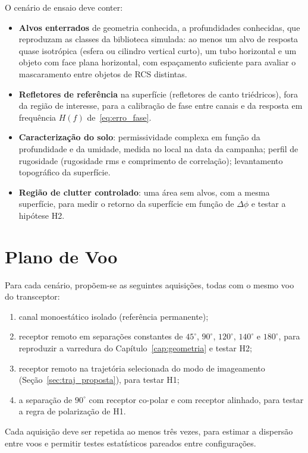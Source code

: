 \documentclass[12pt,a4paper,oneside]{book}
\theoremstyle{remark}
\theoremstyle{plain}
\theoremstyle{definition}
\begin{document}
O cenário de ensaio deve conter:
\begin{itemize}
  \item \textbf{Alvos enterrados} de geometria conhecida, a profundidades
  conhecidas, que reproduzam as classes da biblioteca simulada: ao menos um alvo
  de resposta quase isotrópica (esfera ou cilindro vertical curto), um tubo
  horizontal e um objeto com face plana horizontal, com espaçamento suficiente
  para avaliar o mascaramento entre objetos de RCS distintas.
  \item \textbf{Refletores de referência} na superfície (refletores de canto
  triédricos), fora da região de interesse, para a calibração de fase entre
  canais e da resposta em frequência $H(f)$ de~\eqref{eq:erro_fase}.
  \item \textbf{Caracterização do solo}: permissividade complexa em função da
  profundidade e da umidade, medida no local na data da campanha; perfil de
  rugosidade (rugosidade rms e comprimento de correlação); levantamento
  topográfico da superfície.
  \item \textbf{Região de clutter controlado}: uma área sem alvos, com a mesma
  superfície, para medir o retorno da superfície em função de $\Delta\phi$ e
  testar a hipótese H2.
\end{itemize}

\section{Plano de Voo}
\label{sec:real_voo}


Para cada cenário, propõem-se as seguintes aquisições, todas com o mesmo voo do
transceptor:
\begin{enumerate}
  \item canal monoestático isolado (referência permanente);
  \item receptor remoto em separações constantes de $45^\circ$, $90^\circ$,
  $120^\circ$, $140^\circ$ e $180^\circ$, para reproduzir a varredura do
  Capítulo~\ref{cap:geometria} e testar H2;
  \item receptor remoto na trajetória selecionada do modo de imageamento
  (Seção~\ref{sec:traj_proposta}), para testar H1;
  \item a separação de $90^\circ$ com receptor co-polar e com receptor alinhado,
  para testar a regra de polarização de H1.
\end{enumerate}
Cada aquisição deve ser repetida ao menos três vezes, para estimar a dispersão
entre voos e permitir testes estatísticos pareados entre configurações.
\end{document}

